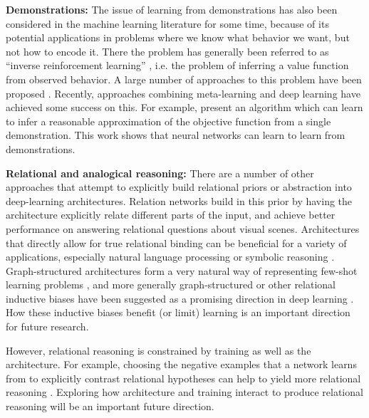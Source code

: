 \textbf{Demonstrations:} The issue of learning from demonstrations has also been considered in the machine learning literature for some time, because of its potential applications in problems where we know what behavior we want, but not how to encode it. There the problem has generally been referred to as ``inverse reinforcement learning'' \citep{Ng2000}, i.e. the problem of inferring a value function from observed behavior. A large number of approaches to this problem have been proposed \citep[e.g.][]{Ng2000, Abbeel2004}. Recently, approaches combining meta-learning and deep learning have achieved some success on this. For example, \citet{Finn2016} present an algorithm which can learn to infer a reasonable approximation of the objective function from a single demonstration. This work shows that neural networks can learn to learn from demonstrations. \par

\textbf{Relational and analogical reasoning:} There are a number of other approaches that attempt to explicitly build relational priors or abstraction into deep-learning architectures. Relation networks \citep{Santoro2017} build in this prior by having the architecture explicitly relate different parts of the input, and achieve better performance on answering relational questions about visual scenes. Architectures that directly allow for true relational binding can be beneficial for a variety of applications, especially natural language processing or symbolic reasoning \citep[e.g.][]{Smolensky1990, Smolensky2014, Huang2017}. Graph-structured architectures form a very natural way of representing few-shot learning problems \citep{Garcia2018}, and more generally graph-structured or other relational inductive biases have been suggested as a promising direction in deep learning \citep{Battaglia2018}. How these inductive biases benefit (or limit) learning is an important direction for future research. \par 
However, relational reasoning is constrained by training as well as the architecture. For example, choosing the negative examples that a network learns from to explicitly contrast relational hypotheses can help to yield more relational reasoning \citep{Hill2019}. Exploring how architecture and training interact to produce relational reasoning will be an important future direction. \par

